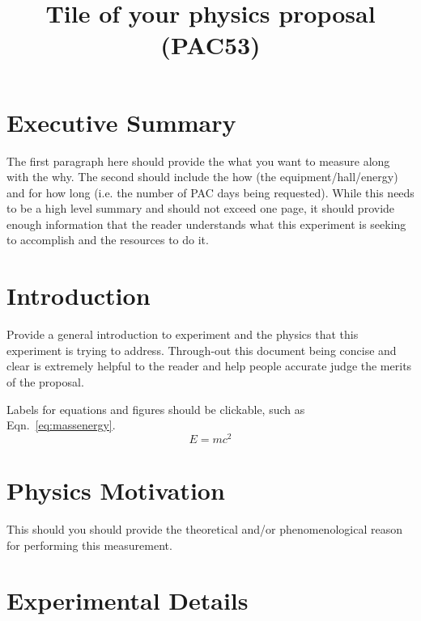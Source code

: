 \documentclass[titlepage,10pt]{article}
\begin{document}
\title{Tile of your physics proposal \\(PAC53)} %


\maketitle

\section*{Executive Summary}

The first paragraph here should provide the what you want to measure along with the why.
The second should include the how (the equipment/hall/energy) and for how long (i.e. the number of PAC days being requested).    While this needs to be a high level summary and should not exceed one page, it should provide enough information that the reader understands what this experiment is seeking to accomplish and the resources to do it.

\tableofcontents

\newpage

\section{Introduction}

Provide a general introduction to experiment and the physics that this experiment is trying to address.   Through-out this document being concise and clear is extremely helpful to the reader and help people accurate judge the merits of the proposal.    

Labels for equations and figures should be clickable, such as Eqn.~\ref{eq:massenergy}.
\begin{equation}
\label{eq:massenergy}
    E=mc^2
\end{equation}

\section{Physics Motivation}

This should you should provide the theoretical and/or phenomenological reason for performing this measurement.  



\section{Experimental Details}
\end{document}
